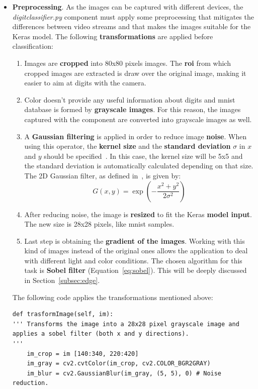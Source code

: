 \begin{itemize}
	\item \textbf{Preprocessing}. As the images can be captured with different devices, the \textit{digitclassifier.py} component must apply some preprocessing that mitigates the differences between video streams and that makes the images suitable for the Keras model. The following \textbf{transformations} are applied before classification:
	\begin{enumerate}
		\item Images are \textbf{cropped} into 80x80 pixels images. The \textbf{\gls{roi}} from which cropped images are extracted is draw over the original image, making it easier to aim at digits with the camera.
		\item Color doesn't provide any useful information about digits and \gls{mnist} database is formed by \textbf{grayscale images}. For this reason, the images captured with the component are converted into grayscale images as well. 
		\item A \textbf{Gaussian filtering} is applied in order to reduce image \textbf{noise}. When using this operator, the \textbf{kernel size} and the \textbf{standard deviation} $\sigma$ in $x$ and $y$ should be specified~\cite{itseez2014theopencv}. In this case, the kernel size will be 5x5 and the standard deviation is automatically calculated depending on that size. The 2D Gaussian filter, as defined in~\cite{sonka1999image}, is given by:
		\begin{equation}
		G(x,y)=\exp(-\frac{x^2+y^2}{2\sigma^2})
		\end{equation}
		\item After reducing noise, the image is \textbf{resized} to fit the Keras \textbf{model input}. The new size is 28x28 pixels, like \gls{mnist} samples.
		\item Last step is obtaining the \textbf{gradient of the images}. Working with this kind of images instead of the original ones allows the application to deal with different light and color conditions. The chosen algorithm for this task is \textbf{Sobel filter} (Equation~\ref{eq:sobel}). This will be deeply discussed in Section~\ref{subsec:edge}.
	\end{enumerate}
	
	The following code applies the transformations mentioned above:
\begin{lstlisting}[frame=single]
def trasformImage(self, im):
''' Transforms the image into a 28x28 pixel grayscale image and
applies a sobel filter (both x and y directions).
''' 
	im_crop = im [140:340, 220:420]
	im_gray = cv2.cvtColor(im_crop, cv2.COLOR_BGR2GRAY)
	im_blur = cv2.GaussianBlur(im_gray, (5, 5), 0) # Noise reduction.
	

\end{lstlisting}
\end{itemize}
